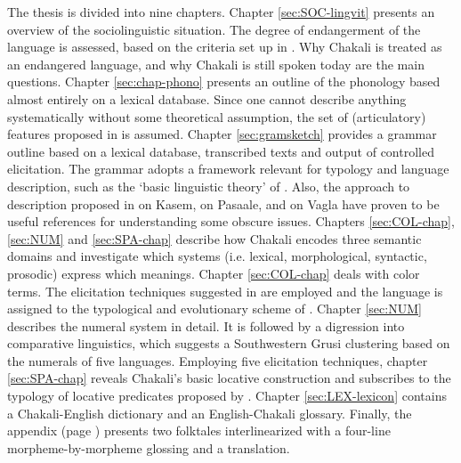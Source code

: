 The thesis is divided into nine chapters. Chapter \ref{sec:SOC-lingvit} presents
an overview of the sociolinguistic situation. The degree of endangerment of the
language is assessed,  based on the criteria set up in \cite{Reco03}.  Why
Chakali is treated as an endangered language,  and why Chakali is still spoken
today  are the main questions. Chapter \ref{sec:chap-phono} presents an outline
of the phonology based almost entirely on a lexical database. Since one cannot
describe anything systematically without some theoretical assumption,  the set
of (articulatory) features proposed in \cite{Lade07} is assumed. Chapter
\ref{sec:gramsketch} provides a grammar outline based on a lexical database,
transcribed texts and output of controlled elicitation. The grammar adopts a
framework relevant for typology and language description, such as the `basic
linguistic theory' of \cite{Dixo10a, Dixo10b}.  Also, the approach to
description proposed in  \cite{Bonv88} on Kasem,
\cite{Mcgi99} on Pasaale,  and \cite{Nade98} on Vagla have proven to be  useful
references for understanding some obscure issues. Chapters \ref{sec:COL-chap}, 
\ref{sec:NUM} and  \ref{sec:SPA-chap} describe how Chakali encodes three
semantic domains  and investigate which systems (i.e. lexical, morphological,
syntactic, prosodic)  express which meanings. Chapter \ref{sec:COL-chap} deals
with color terms. The elicitation techniques suggested in \cite{Davi95} are
employed and the language  is assigned to the typological and evolutionary
scheme of \cite{Kay99}. Chapter \ref{sec:NUM} describes the numeral system in
detail. It is followed by a digression into comparative linguistics,  which
suggests  a Southwestern Grusi clustering  based on the numerals of five
languages.  Employing five elicitation techniques, chapter  \ref{sec:SPA-chap}
reveals Chakali's basic locative construction \cite[15]{Levi06} and  subscribes
to the typology of locative predicates proposed by \cite{Amek07b}. Chapter
\ref{sec:LEX-lexicon} contains  a Chakali-English dictionary and an
English-Chakali glossary. Finally, the appendix (page \pageref{chap:TXT-text}) 
presents two folktales  interlinearized with  a four-line morpheme-by-morpheme
glossing and a translation. 

